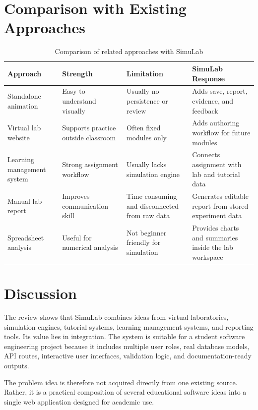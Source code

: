 \documentclass[12pt,a4paper]{report}
\begin{document}
\section{Comparison with Existing Approaches}
\begin{table}[H]
\centering
\caption{Comparison of related approaches with SimuLab}
\begin{tabular}{p{} p{} p{} p{}}
\toprule
\textbf{Approach} & \textbf{Strength} & \textbf{Limitation} & \textbf{SimuLab Response} \\
\midrule
Standalone animation & Easy to understand visually & Usually no persistence or review & Adds save, report, evidence, and feedback \\
Virtual lab website & Supports practice outside classroom & Often fixed modules only & Adds authoring workflow for future modules \\
Learning management system & Strong assignment workflow & Usually lacks simulation engine & Connects assignment with lab and tutorial data \\
Manual lab report & Improves communication skill & Time consuming and disconnected from raw data & Generates editable report from stored experiment data \\
Spreadsheet analysis & Useful for numerical analysis & Not beginner friendly for simulation & Provides charts and summaries inside the lab workspace \\
\bottomrule
\end{tabular}
\end{table}

\section{Discussion}
The review shows that SimuLab combines ideas from virtual laboratories, simulation engines, tutorial systems, learning management systems, and reporting tools. Its value lies in integration. The system is suitable for a student software engineering project because it includes multiple user roles, real database models, API routes, interactive user interfaces, validation logic, and documentation-ready outputs.

The problem idea is therefore not acquired directly from one existing source. Rather, it is a practical composition of several educational software ideas into a single web application designed for academic use.

\end{document}
